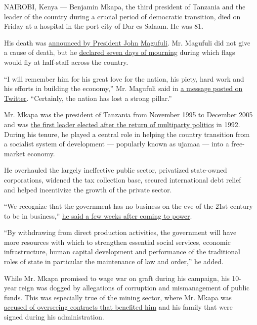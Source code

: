 NAIROBI, Kenya --- Benjamin Mkapa, the third president of Tanzania and
the leader of the country during a crucial period of democratic
transition, died on Friday at a hospital in the port city of Dar es
Salaam. He was 81.

His death was
\href{https://twitter.com/MsigwaGerson/status/1286429773590343680}{announced
by President John Magufuli}. Mr. Magufuli did not give a cause of death,
but he
\href{https://twitter.com/MsigwaGerson/status/1286444641743757321}{declared
seven days of mourning} during which flags would fly at half-staff
across the country.

``I will remember him for his great love for the nation, his piety, hard
work and his efforts in building the economy,'' Mr. Magufuli said in
\href{https://twitter.com/MagufuliJP/status/1286433004513038337}{a
message posted on Twitter}. ``Certainly, the nation has lost a strong
pillar.''

Mr. Mkapa was the president of Tanzania from November 1995 to December
2005 and was
\href{https://www.nytimes3xbfgragh.onion/1995/10/29/world/a-joyful-but-anxious-vote-in-tanzania.html}{the
first leader elected after the return of multiparty politics} in 1992.
During his tenure, he played a central role in helping the country
transition from a socialist system of development --- popularly known as
ujamaa --- into a free-market economy.

He overhauled the largely ineffective public sector, privatized
state-owned corporations, widened the tax collection base, secured
international debt relief and helped incentivize the growth of the
private sector.

``We recognize that the government has no business on the eve of the
21st century to be in business,''
\href{https://commons.wmu.se/cgi/viewcontent.cgi?article=1315\&context=all_dissertations\#page=52}{he
said a few weeks after coming to power}.

``By withdrawing from direct production activities, the government will
have more resources with which to strengthen essential social services,
economic infrastructure, human capital development and performance of
the traditional roles of state in particular the maintenance of law and
order,'' he added.

While Mr. Mkapa promised to wage war on graft during his campaign, his
10-year reign was dogged by allegations of corruption and mismanagement
of public funds. This was especially true of the mining sector, where
Mr. Mkapa was
\href{https://allafrica.com/stories/201905130115.html}{accused of
overseeing contracts that benefited him} and his family that were signed
during his administration.

